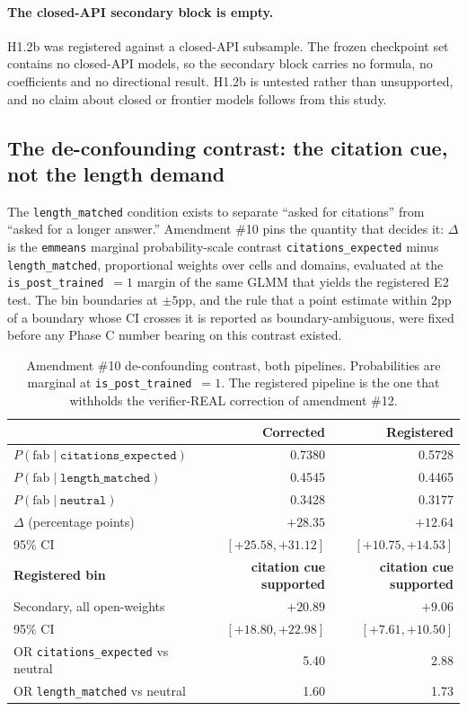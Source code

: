 \paragraph{The closed-API secondary block is empty.}
H1.2b was registered against a closed-API subsample. The frozen checkpoint set
contains no closed-API models, so the secondary block carries no formula, no
coefficients and no directional result. H1.2b is untested rather than
unsupported, and no claim about closed or frontier models follows from this
study.

\subsection{The de-confounding contrast: the citation cue, not the length demand}

The \texttt{length\_matched} condition exists to separate ``asked for citations''
from ``asked for a longer answer.'' Amendment \#10 pins the quantity that decides
it: $\Delta$ is the \texttt{emmeans} marginal probability-scale contrast
\texttt{citations\_expected} minus \texttt{length\_matched}, proportional weights
over cells and domains, evaluated at the \texttt{is\_post\_trained}~$=1$ margin of
the same GLMM that yields the registered E2 test. The bin boundaries at
$\pm 5$pp, and the rule that a point estimate within 2pp of a boundary whose CI
crosses it is reported as boundary-ambiguous, were fixed before any Phase C
number bearing on this contrast existed.

\begin{table}[htbp]
\centering
\small
\caption{Amendment \#10 de-confounding contrast, both pipelines. Probabilities
are marginal at \texttt{is\_post\_trained}~$=1$. The registered pipeline is the
one that withholds the verifier-REAL correction of amendment \#12.}
\label{tab:amd10}
\begin{tabular}{@{}l r r@{}}
\toprule
 & Corrected & Registered \\
\midrule
$P(\text{fab} \mid \texttt{citations\_expected})$ & 0.7380 & 0.5728 \\
$P(\text{fab} \mid \texttt{length\_matched})$     & 0.4545 & 0.4465 \\
$P(\text{fab} \mid \texttt{neutral})$             & 0.3428 & 0.3177 \\
\midrule
$\Delta$ (percentage points) & $+28.35$ & $+12.64$ \\
95\% CI                      & $[+25.58, +31.12]$ & $[+10.75, +14.53]$ \\
\textbf{Registered bin}      & \textbf{citation cue supported} & \textbf{citation cue supported} \\
\midrule
Secondary, all open-weights  & $+20.89$ & $+9.06$ \\
95\% CI                      & $[+18.80, +22.98]$ & $[+7.61, +10.50]$ \\
\midrule
OR \texttt{citations\_expected} vs neutral & 5.40 & 2.88 \\
OR \texttt{length\_matched} vs neutral     & 1.60 & 1.73 \\
\bottomrule
\end{tabular}
\end{table}


